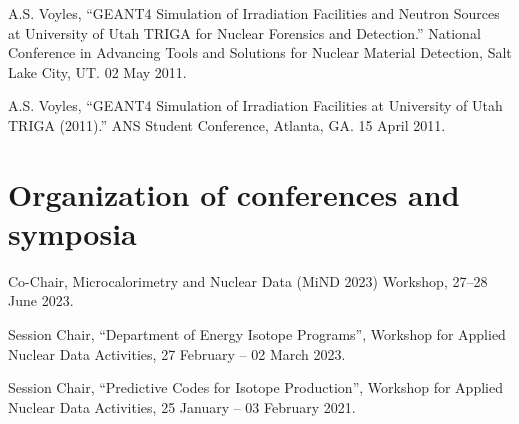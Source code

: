 \begin{bibsection}
\item A.S. Voyles, \enquote{GEANT4 Simulation of Irradiation Facilities and Neutron Sources at University of Utah TRIGA for
Nuclear Forensics and Detection.}   National Conference in Advancing Tools and Solutions for
Nuclear Material Detection, Salt Lake City, UT. 02 May 2011.

\item A.S. Voyles, \enquote{GEANT4 Simulation of Irradiation Facilities at University of Utah TRIGA (2011).} 
ANS Student Conference, Atlanta, GA. 15 April 2011.

\end{bibsection}


\section{\sc Organization of conferences and symposia}

\begin{list2}

\item Co-Chair,  Microcalorimetry and Nuclear Data (MiND 2023) Workshop,  27--28 June 2023.

\item Session Chair, \enquote{Department of Energy Isotope Programs}, Workshop for Applied Nuclear Data Activities,  27 February -- 02 March 2023.

\item Session Chair, \enquote{Predictive Codes for Isotope Production}, Workshop for Applied Nuclear Data Activities,  25 January -- 03 February 2021.

\end{list2}
